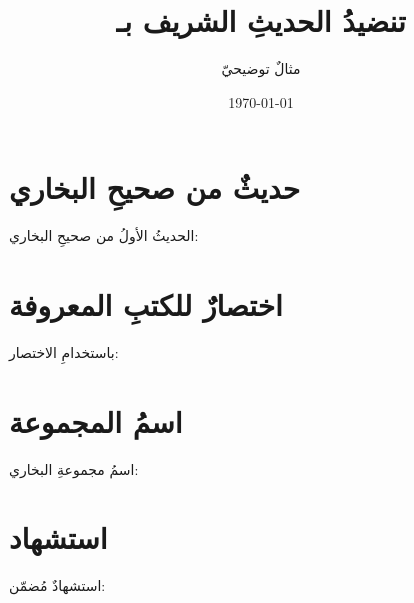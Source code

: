 \documentclass[12pt, a4paper]{article}
\title{تنضيدُ الحديثِ الشريف بـ\LR{LaTeX}}
\author{مثالٌ توضيحيّ}
\date{\today}
\begin{document}
\maketitle

\section{حديثٌ من صحيحِ البخاري}

الحديثُ الأولُ من صحيحِ البخاري:

\hadith[bukhari][1]

\section{اختصارٌ للكتبِ المعروفة}

باستخدامِ الاختصار:



\section{اسمُ المجموعة}

اسمُ مجموعةِ البخاري: 

\section{استشهاد}

استشهادٌ مُضمّن: \hadithcite[bukhari][1]
\end{document}
